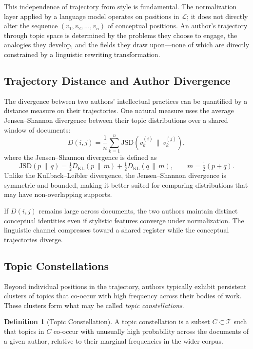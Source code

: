 \documentclass[12pt,a4paper]{article}
\theoremstyle{definition}
\newtheorem{definition}{Definition}[section]
\theoremstyle{plain}
\theoremstyle{remark}
\newcommand{\calL}{\mathcal{L}}
\newcommand{\calT}{\mathcal{T}}
\begin{document}
This independence of trajectory from style is fundamental. The normalization layer applied by
a language model operates on positions in $\calL$; it does not directly alter the sequence
$(v_1, v_2, \ldots, v_n)$ of conceptual positions. An author's trajectory through topic space
is determined by the problems they choose to engage, the analogies they develop, and the
fields they draw upon---none of which are directly constrained by a linguistic rewriting
transformation.

\subsection{Trajectory Distance and Author Divergence}

The divergence between two authors' intellectual practices can be quantified by a distance
measure on their trajectories. One natural measure uses the average Jensen--Shannon divergence
between their topic distributions over a shared window of documents:
\[
D(i, j) = \frac{1}{n} \sum_{k=1}^{n}
\mathrm{JSD}(v_k^{(i)} \,\|\, v_k^{(j)}),
\]
where the Jensen--Shannon divergence is defined as
\[
\mathrm{JSD}(p \,\|\, q) = \tfrac{1}{2} D_{\mathrm{KL}}(p \,\|\, m) +
\tfrac{1}{2} D_{\mathrm{KL}}(q \,\|\, m), \qquad m = \tfrac{1}{2}(p+q).
\]
Unlike the Kullback--Leibler divergence, the Jensen--Shannon divergence is symmetric and
bounded, making it better suited for comparing distributions that may have non-overlapping
supports.

If $D(i,j)$ remains large across documents, the two authors maintain distinct conceptual
identities even if stylistic features converge under normalization. The linguistic channel
compresses toward a shared register while the conceptual trajectories diverge.

\subsection{Topic Constellations}

Beyond individual positions in the trajectory, authors typically exhibit persistent clusters
of topics that co-occur with high frequency across their bodies of work. These clusters form
what may be called \emph{topic constellations}.

\begin{definition}[Topic Constellation]
A topic constellation is a subset $C \subset \calT$ such that topics in $C$ co-occur with
unusually high probability across the documents of a given author, relative to their marginal
frequencies in the wider corpus.
\end{definition}
\end{document}
